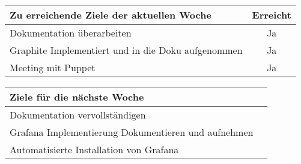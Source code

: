 \begin{tabularx}{\textwidth}{Xc}
    \arrayrulecolor{OliveGreen}
    \toprule
    {\bfseries Zu erreichende Ziele der aktuellen Woche} & {\bfseries Erreicht} \\
    \midrule[2pt]
    Dokumentation überarbeiten                              &Ja              \\
    \rowcolor{OliveGreen!15}
    Graphite Implementiert und in die Doku aufgenommen      &Ja              \\
    \rowcolor{White}
    Meeting mit Puppet                                      &Ja              \\
    \bottomrule[2pt]
\end{tabularx}
%
\vspace{1cm}
%
\begin{tabularx}{\textwidth}{Xc}
    \arrayrulecolor{OliveGreen}
    \toprule
    {\bfseries Ziele für die nächste Woche}        &                         \\
    \midrule[2pt]
    Dokumentation vervollständigen                 &                         \\
    \rowcolor{OliveGreen!15}
    Grafana Implementierung Dokumentieren und aufnehmen   &                  \\
    \rowcolor{White}
    Automatisierte Installation von Grafana        &                         \\
\end{tabularx}
